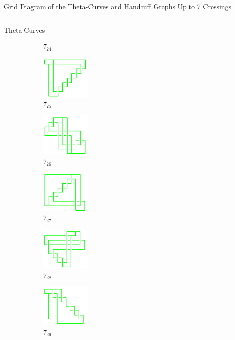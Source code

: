 \documentclass[final]{beamer}
\begin{document}
\begin{frame}[t]
\begin{alertblock}{Grid Diagram of the Theta-Curves and Handcuff Graphs Up to 7 Crossings}
\begin{columns}[t]
\begin{column}{0.6\textwidth}
\begin{alertblock}{Theta-Curves}
\begin{figure}
\begin{subfigure}{0.075\textwidth}
    \caption{$7_{24}$} 
    \end{subfigure}
    \begin{subfigure}{0.075\textwidth}
    \includegraphics[width=2.4cm]{../Midterm_Poster/grid_diagram/theta_7_25.png}
    \caption{$7_{25}$} 
    \end{subfigure}
    \begin{subfigure}{0.075\textwidth}
    \includegraphics[width=2.4cm]{../Midterm_Poster/grid_diagram/theta_7_26.png}
    \caption{$7_{26}$} 
    \end{subfigure}
    \begin{subfigure}{0.075\textwidth}
    \includegraphics[width=2.4cm]{../Midterm_Poster/grid_diagram/theta_7_27.png}
    \caption{$7_{27}$} 
    \end{subfigure}
    \begin{subfigure}{0.075\textwidth}
    \includegraphics[width=2.4cm]{../Midterm_Poster/grid_diagram/theta_7_28.png}
    \caption{$7_{28}$} 
    \end{subfigure}
    \begin{subfigure}{0.075\textwidth}
    \includegraphics[width=2.4cm]{../Midterm_Poster/grid_diagram/theta_7_29.png}
    \caption{$7_{29}$} 
    \end{subfigure}
    \begin{subfigure}{0.075\textwidth}

\end{subfigure}
\end{figure}
\end{alertblock}
\end{column}
\end{columns}
\end{alertblock}
\end{frame}
\end{document}
